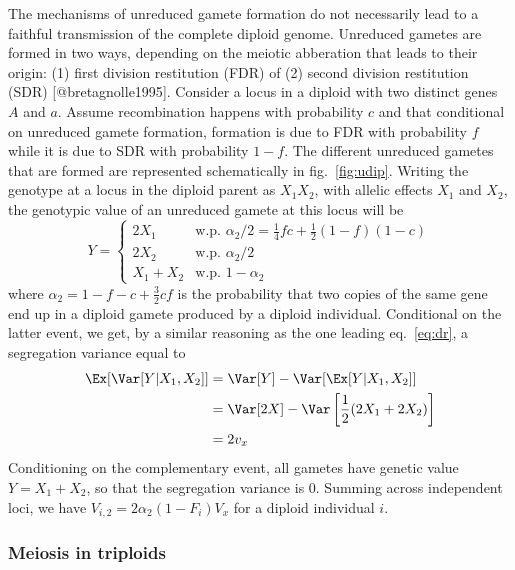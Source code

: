 The mechanisms of unreduced gamete formation do not necessarily lead to
a faithful transmission of the complete diploid genome. Unreduced
gametes are formed in two ways, depending on the meiotic abberation that
leads to their origin: (1) first division restitution (FDR) of (2)
second division restitution (SDR) {[}@bretagnolle1995{]}. Consider a
locus in a diploid with two distinct genes \(A\) and \(a\). Assume
recombination happens with probability \(c\) and that conditional on
unreduced gamete formation, formation is due to FDR with probability
\(f\) while it is due to SDR with probability \(1-f\). The different
unreduced gametes that are formed are represented schematically in
fig.~\ref{fig:udip}. Writing the genotype at a locus in the diploid
parent as \(X_1X_2\), with allelic effects \(X_1\) and \(X_2\), the
genotypic value of an unreduced gamete at this locus will be
\[Y = \begin{cases}
    2X_1 & \text{w.p. } \alpha_2/2 = \frac1 4 f c + \frac1 2 (1-f)(1-c) \\
    2X_2 & \text{w.p. } \alpha_2/2 \\
    X_1 + X_2 & \text{w.p. } 1-\alpha_2 
    \end{cases}\] where \(\alpha_2 = 1 - f - c + \frac{3}{2}cf\) is the
probability that two copies of the same gene end up in a diploid gamete
produced by a diploid individual. Conditional on the latter event, we
get, by a similar reasoning as the one leading eq.~\ref{eq:dr}, a
segregation variance equal to \begin{align*}
\Ex[\Var[Y|X_1,X_2]] &= \Var[Y] - \Var[\Ex[Y|X_1,X_2]] \\
    &= \Var[2X] - \Var\left[\frac{1}{2}(2X_1 + 2X_2)\right] \\
    &= 2v_x
\end{align*} Conditioning on the complementary event, all gametes have
genetic value \(Y = X_1+X_2\), so that the segregation variance is 0.
Summing across independent loci, we have
\(V_{i,2} = 2\alpha_2(1-F_i)V_x\) for a diploid individual \(i\).

\hypertarget{meiosis-in-triploids}{%
\subsubsection{Meiosis in triploids}\label{meiosis-in-triploids}}


